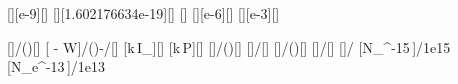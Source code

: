 [\nano\meter][e-9][\meter]
[\electronvolt][1.602176634e-19][\joule]
[\volt]
[\micro\ampere][e-6][\ampere]
[\milli\watt][e-3][\watt]

[]{\nchX*\nccX/(\nceX*\laX)}[\electronvolt]
[ - W]{\nchX*\nccX/(\nceX*\laX)-\WaX/\nceX}[\electronvolt]
[k\,I_]{\kfX*\IsX}[\ampere]
[k\,P]{\kfX*\PlX}[\watt]
[]{\PlX*\laX/(\nchX*\nccX)}[\per\second]
[]{\IsX/\nceX}[\per\second]
[]{\kfX*\PlX*\laX/(\nchX*\nccX)}[\per\second]
[]{\kfX*\IsX/\nceX}[\per\second]
[]{\NeX/\NaX}
[N_^{-15}\,]{\NaX/1e15}
[N_e^{-13}\,]{\NeX/1e13}
